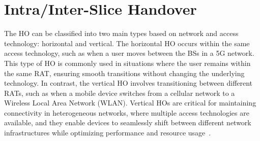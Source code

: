 \documentclass[graybox]{svmult}
\begin{document}
\section{Intra/Inter-Slice Handover}\label{sec:shd}
The HO can be classified into two main types based on network and access technology: horizontal and vertical. The horizontal HO occurs within the same access technology, such as when a user moves between the BSs in a 5G network. This type of HO is commonly used in situations where the user remains within the same RAT, ensuring smooth transitions without changing the underlying technology. In contrast, the vertical HO involves transitioning between different RATs, such as when a mobile device switches from a cellular network to a Wireless Local Area Network (WLAN). Vertical HOs are critical for maintaining connectivity in heterogeneous networks, where multiple access technologies are available, and they enable devices to seamlessly shift between different network infrastructures while optimizing performance and resource usage~\cite{10147830, 8141874, PALMIERI2020107365}. 
\end{document}
